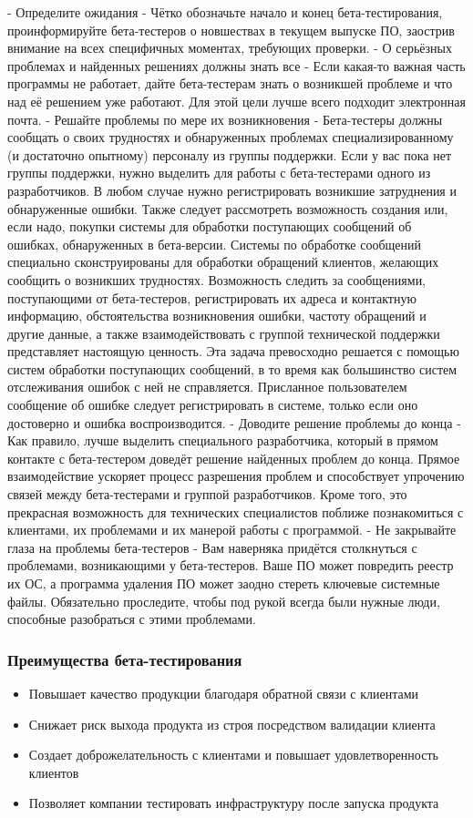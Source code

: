 \documentclass{../industrial-development}
\begin{document}
\lecturenotes
- Определите ожидания - Чётко обозначьте начало и конец бета-тестирования, проинформируйте бета-тестеров о новшествах в текущем выпуске ПО, заострив внимание на всех специфичных моментах, требующих проверки. 
- О серьёзных проблемах и найденных решениях должны знать все - Если какая-то важная часть программы не работает, дайте бета-тестерам знать о возникшей проблеме и что над её решением уже работают. Для этой цели лучше всего подходит электронная почта. 
- Решайте проблемы по мере их возникновения - Бета-тестеры должны сообщать о своих трудностях и обнаруженных проблемах специализированному (и достаточно опытному) персоналу из группы поддержки. Если у вас пока нет группы поддержки, нужно выделить для работы с бета-тестерами одного из разработчиков. В любом случае нужно регистрировать возникшие затруднения и обнаруженные ошибки. Также следует рассмотреть возможность создания или, если надо, покупки системы для обработки поступающих сообщений об ошибках, обнаруженных в бета-версии. Системы по обработке сообщений специально сконструированы для обработки обращений клиентов, желающих сообщить о возникших трудностях. Возможность следить за сообщениями, поступающими от бета-тестеров, регистрировать их адреса и контактную информацию, обстоятельства возникновения ошибки, частоту обращений и другие данные, а также взаимодействовать с группой технической поддержки представляет настоящую ценность. Эта задача превосходно решается с помощью систем обработки поступающих сообщений, в то время как большинство систем отслеживания ошибок с ней не справляется. Присланное пользователем сообщение об ошибке следует регистрировать в системе, только если оно достоверно и ошибка воспроизводится.
- Доводите решение проблемы до конца - Как правило, лучше выделить специального разработчика, который в прямом контакте с бета-тестером доведёт решение найденных проблем до конца. Прямое взаимодействие ускоряет процесс разрешения проблем и способствует упрочению связей между бета-тестерами и группой разработчиков. Кроме того, это прекрасная возможность для технических специалистов поближе познакомиться с клиентами, их проблемами и их манерой работы с программой.
- Не закрывайте глаза на проблемы бета-тестеров - Вам наверняка придётся столкнуться с проблемами, возникающими у бета-тестеров. Ваше ПО может повредить реестр их ОС, а программа удаления ПО может заодно стереть ключевые системные файлы. Обязательно проследите, чтобы под рукой всегда были нужные люди, способные разобраться с этими проблемами.

\begin{frame} \frametitle{Преимущества бета-тестирования}
	\begin{itemize}
		\item Повышает качество продукции благодаря обратной связи с клиентами
		\item Снижает риск выхода продукта из строя посредством валидации клиента
		\item Создает доброжелательность с клиентами и повышает удовлетворенность клиентов
		\item Позволяет компании тестировать инфраструктуру после запуска продукта
	\end{itemize}
\end{frame}
\end{document}

